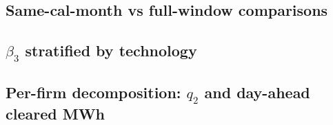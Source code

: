 \documentclass[11pt,a4paper]{article}
\begin{document}
\subsection{Same-cal-month vs full-window comparisons}\label{app:window}

% 
%

\subsection{$\beta_3$ stratified by technology}\label{app:B1_tech}


%

\subsection{Per-firm decomposition: $q_2$ and day-ahead cleared MWh}\label{app:per_firm}
\end{document}
